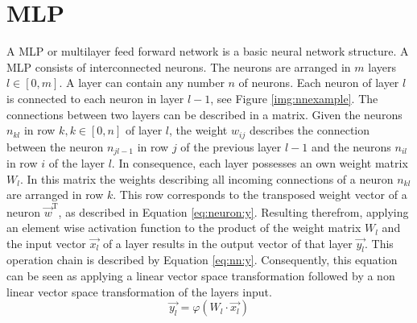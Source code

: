 	\section{\ac{MLP}}
	\label{sec:mlp}
		A \ac{MLP} or multilayer feed forward network is a basic neural network structure. A \ac{MLP} consists of interconnected neurons. The neurons are arranged in $m$ layers $l \in [0,m]$. A layer can contain any number $n$ of neurons. Each neuron of layer $l$ is connected to each neuron in layer $l-1$, see Figure \ref{img:nnexample}. \autocite{Svozil.1997} The connections between two layers can be described in a matrix. Given the neurons $n_{kl}$ in row $k, k \in [0,n]$ of layer $l$, the weight $w_{ij}$ describes the connection between the neuron $n_{jl-1}$ in row $j$ of the previous layer $l-1$ and the neurons $n_{il}$ in row $i$ of the layer $l$. In consequence, each layer possesses an own weight matrix $W_l$. In this matrix the weights describing all incoming connections of a neuron $n_{kl}$ are arranged in row $k$. This row corresponds to the transposed weight vector of a neuron $\vec{w}^{\mathrm {T}}$, as described in Equation \eqref{eq:neuron:y}. Resulting therefrom, applying an element wise activation function to the product of the weight matrix $W_l$ and the input vector $\vec{x_l}$ of a layer results in the output vector of that layer $\vec{y_l}$. This operation chain is described by Equation \ref{eq:nn:y}. Consequently, this equation can be seen as applying a linear vector space transformation followed by a non linear vector space transformation of the layers input.
		\begin{equation}
			\label{eq:nn:y}
			\vec{y_l} = \varphi(W_l \cdot \vec{x_l})
		\end{equation}

